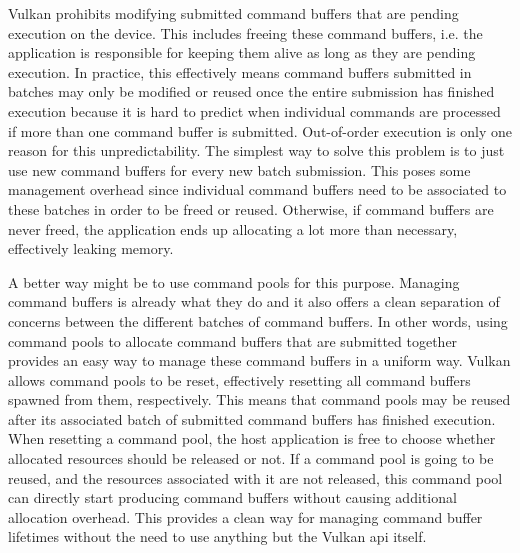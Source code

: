 
        Vulkan prohibits modifying submitted command buffers that are pending execution on the device.
        This includes freeing these command buffers, i.e. the application is responsible for keeping them alive as long as they are pending execution.
        In practice, this effectively means command buffers submitted in batches may only be modified or reused once the entire submission has finished execution because it is hard to predict when individual commands are processed if more than one command buffer is submitted.
        Out-of-order execution is only one reason for this unpredictability.
        The simplest way to solve this problem is to just use new command buffers for every new batch submission.
        This poses some management overhead since individual command buffers need to be associated to these batches in order to be freed or reused.
        Otherwise, if command buffers are never freed, the application ends up allocating a lot more than necessary, effectively leaking memory.

        A better way might be to use command pools for this purpose.
        Managing command buffers is already what they do and it also offers a clean separation of concerns between the different batches of command buffers.
        In other words, using command pools to allocate command buffers that are submitted together provides an easy way to manage these command buffers in a uniform way.
        Vulkan allows command pools to be reset, effectively resetting all command buffers spawned from them, respectively.
        This means that command pools may be reused after its associated batch of submitted command buffers has finished execution.
        When resetting a command pool, the host application is free to choose whether allocated resources should be released or not.
        If a command pool is going to be reused, and the resources associated with it are not released, this command pool can directly start producing command buffers without causing additional allocation overhead.
        This provides a clean way for managing command buffer lifetimes without the need to use anything but the Vulkan \gls{api} itself.

